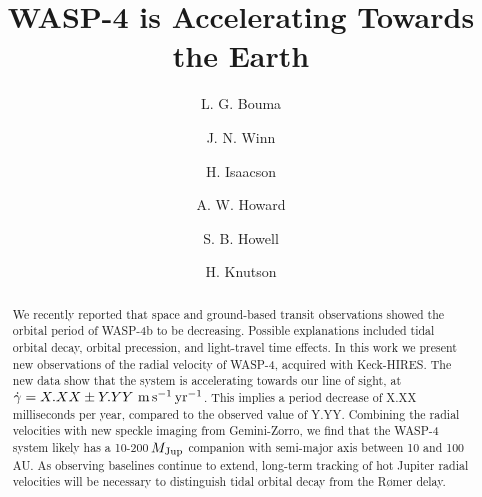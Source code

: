 \documentclass[12pt,twocolumn,tighten]{aastex62}
\begin{document}

\title{WASP-4 is Accelerating Towards the Earth}


%
%
\author[0000-0002-0514-5538]{L. G. Bouma}
%
\author[0000-0002-4265-047X]{J. N. Winn}

%
%
\author[0000-0002-0531-1073]{H. Isaacson}
%
\author[0000-0001-8638-0320]{A. W. Howard}
%
\author{S. B. Howell}
%
\author{H. Knutson}
%
%
%

\begin{abstract}
  We recently reported that space and ground-based transit observations
  showed the orbital period of WASP-4b to be decreasing.
  Possible explanations included tidal orbital decay, orbital
  precession, and light-travel time effects.
  In this work we present new observations of the radial velocity of
  WASP-4, acquired with Keck-HIRES.
  The new data show that the system is accelerating towards our line
  of sight, at $\dot{\gamma} = X.XX \pm Y.YY\ {\rm m}\,{\rm
  s}^{-1}\,{\rm yr}^{-1}$.
  This implies a period decrease of X.XX milliseconds per year,
  compared to the observed value of Y.YY.
  Combining the radial velocities with new speckle imaging from
  Gemini-Zorro, we find that the WASP-4 system likely has a
  10-200$\,M_{\rm Jup}$ companion with semi-major axis between 10 and
  100$\,$AU.
  As observing baselines continue to extend, long-term tracking of hot
  Jupiter radial velocities will be necessary to distinguish tidal
  orbital decay from the R{\o}mer delay.
\end{abstract}
\end{document}
